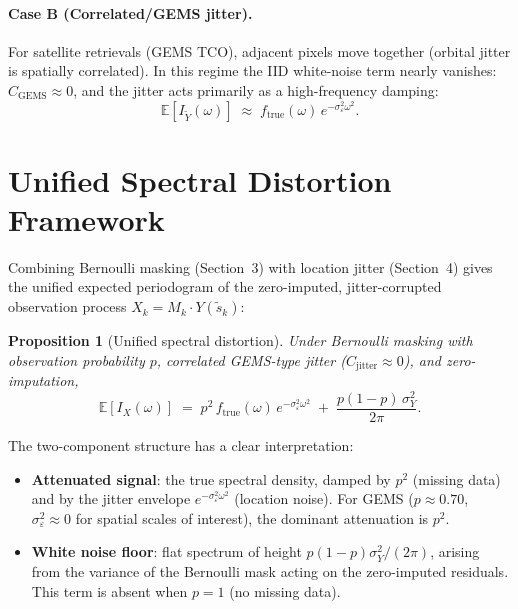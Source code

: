 \documentclass[12pt]{article}
\newtheorem{proposition}{Proposition}
\begin{document}
\paragraph{Case B (Correlated/GEMS jitter).}
For satellite retrievals (GEMS TCO), adjacent pixels move together
(orbital jitter is spatially correlated).
In this regime the IID white-noise term nearly vanishes:
$C_{\text{GEMS}} \approx 0$,
and the jitter acts primarily as a high-frequency damping:
\[
    \mathbb{E}[I_{\tilde{Y}}(\omega)]
    \;\approx\; f_{\mathrm{true}}(\omega)\,e^{-\sigma^2_\varepsilon \omega^2}.
\]


\section{Unified Spectral Distortion Framework}

Combining Bernoulli masking (Section~3) with location jitter
(Section~4) gives the unified expected periodogram of the
zero-imputed, jitter-corrupted observation process
$X_k = M_k \cdot Y(\tilde{s}_k)$:

\begin{proposition}[Unified spectral distortion]
\label{prop:unified}
Under Bernoulli masking with observation probability $p$,
correlated GEMS-type jitter ($C_{\mathrm{jitter}} \approx 0$),
and zero-imputation,
\[
  \boxed{
    \mathbb{E}[I_X(\omega)]
    \;=\; p^2\,f_{\mathrm{true}}(\omega)\,e^{-\sigma^2_\varepsilon \omega^2}
        \;+\; \frac{p(1-p)\,\sigma^2_Y}{2\pi}.
  }
\]
\end{proposition}

The two-component structure has a clear interpretation:
\begin{itemize}
  \item \textbf{Attenuated signal}: the true spectral density, damped
        by $p^2$ (missing data) and by the jitter envelope
        $e^{-\sigma^2_\varepsilon\omega^2}$ (location noise).
        For GEMS ($p\approx 0.70$, $\sigma^2_\varepsilon \approx 0$ for
        spatial scales of interest), the dominant attenuation is $p^2$.
  \item \textbf{White noise floor}: flat spectrum of height
        $p(1-p)\sigma^2_Y/(2\pi)$, arising from the variance of the
        Bernoulli mask acting on the zero-imputed residuals.
        This term is absent when $p=1$ (no missing data).
\end{itemize}
\end{document}
